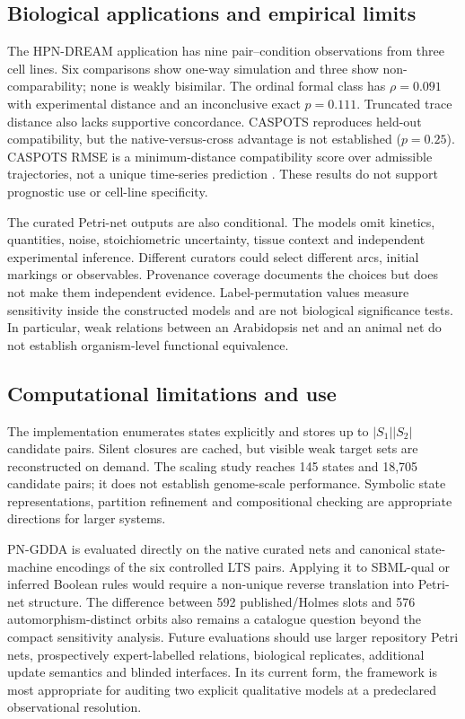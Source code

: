 \documentclass[JMCS,submit]{resources/ISRP}
\theoremstyle{definition}
\theoremstyle{remark}
\numberwithin{equation}{section}
\begin{document}
\subsection{Biological applications and empirical limits}
\label{sec:discussion-biological}

The HPN-DREAM application has nine pair--condition observations from three cell
lines. Six comparisons show one-way simulation and three show
non-comparability; none is weakly bisimilar. The ordinal formal class has
$\rho=0.091$ with experimental distance and an inconclusive exact $p=0.111$.
Truncated trace distance also lacks supportive concordance. CASPOTS reproduces
held-out compatibility, but the native-versus-cross advantage is not established
($p=0.25$). CASPOTS RMSE is a minimum-distance compatibility score over
admissible trajectories, not a unique time-series prediction \cite{Razzaq2018}.
These results do not support prognostic use or cell-line specificity.

The curated Petri-net outputs are also conditional. The models omit kinetics,
quantities, noise, stoichiometric uncertainty, tissue context and independent
experimental inference. Different curators could select different arcs, initial
markings or observables. Provenance coverage documents the choices but does not
make them independent evidence. Label-permutation values measure sensitivity
inside the constructed models and are not biological significance tests. In
particular, weak relations between an Arabidopsis net and an animal net do not
establish organism-level functional equivalence.

\subsection{Computational limitations and use}
\label{sec:discussion-computation}

The implementation enumerates states explicitly and stores up to
$|S_1||S_2|$ candidate pairs. Silent closures are cached, but visible weak target
sets are reconstructed on demand. The scaling study reaches 145 states and
18,705 candidate pairs; it does not establish genome-scale performance. Symbolic
state representations, partition refinement and compositional checking are
appropriate directions for larger systems.

PN-GDDA is evaluated directly on the native curated nets and canonical
state-machine encodings of the six controlled LTS pairs. Applying it to
SBML-qual or inferred Boolean rules would require a non-unique reverse translation
into Petri-net structure. The difference between 592 published/Holmes slots and
576 automorphism-distinct orbits also remains a catalogue question beyond the
compact sensitivity analysis. Future evaluations should use larger repository
Petri nets, prospectively expert-labelled relations, biological replicates,
additional update semantics and blinded interfaces. In its current form, the
framework is most appropriate for auditing two explicit qualitative models at a
predeclared observational resolution.
\end{document}
